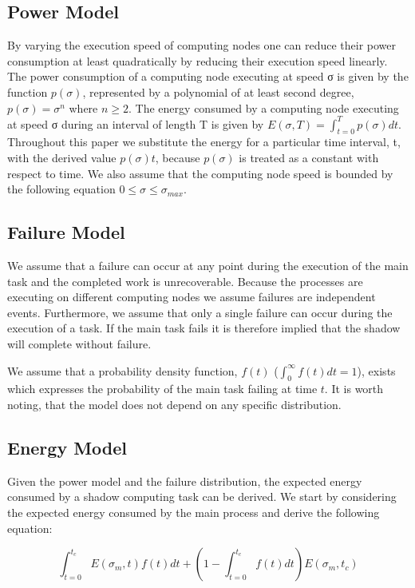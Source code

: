 \subsection{Power Model}
By varying the execution speed of computing nodes one can reduce their
power consumption at least quadratically by reducing their execution
speed linearly. The power consumption of a computing node executing at
speed σ is given by the function $p(\sigma)$, represented by a
polynomial of at least second degree, $p(\sigma)=\sigma^n$ where
$n\geq2$. The energy consumed by a computing node executing at speed σ
during an interval of length T is given by $E(\sigma,T)=\int_{t=0}^T
p(\sigma)dt$. Throughout this paper we substitute the energy for a
particular time interval, t, with the derived value $p(\sigma)t$,
because $p(\sigma)$ is treated as a constant with respect to time. We
also assume that the computing node speed is bounded by the following
equation $0\leq\sigma\leq\sigma_{max}$.

\subsection{Failure Model}
We assume that a failure can occur at any point during the execution
of the main task and the completed work is unrecoverable. Because the
processes are executing on different computing nodes we assume
failures are independent events. Furthermore, we assume that only a
single failure can occur during the execution of a task. If the main
task fails it is therefore implied that the shadow will complete
without failure.

We assume that a probability density function, $f(t)$ ($\int_0^\infty
f(t)dt=1$), exists which expresses the probability of the main task
failing at time $t$. It is worth noting, that the model does not
depend on any specific distribution.

\subsection{Energy Model}
Given the power model and the failure distribution, the expected
energy consumed by a shadow computing task can be derived. We start by
considering the expected energy consumed by the main process and
derive the following equation:

\begin{equation}
\int_{t=0}^{t_c}E(\sigma_m,t)f(t)dt + (1-\int_{t=0}^{t_c}f(t)dt)E(\sigma_m,t_c)
\end{equation}

